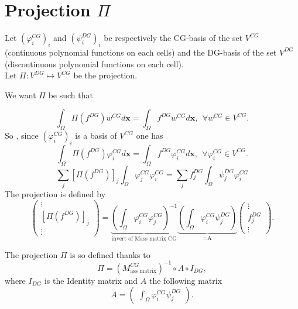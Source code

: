 \documentclass[a4paper, 11pt]{report}
\begin{document}
\section{Projection $\Pi$}
Let $(\varphi_i^{CG})_i$ and $(\psi_i^{DG})_i$ be respectively the CG-basis of the set $V^{CG}$ (continuous polynomial functions on each cells)  and the DG-basis of the set $V^{DG}$ (discontinuous polynomial functions on each cell). \\
Let $\Pi : V^{DG} \mapsto V^{CG} $ be the projection.


We want $\Pi$ be such that 

\begin{equation*}
\int_{\Omega}\Pi(f^{DG})w^{CG}d\boldsymbol{x}=\int_{\Omega}f^{DG}w^{CG}d\boldsymbol{x},\ \ \forall w^{CG} \in V^{CG}.
\end{equation*}
So , since $(\varphi_i^{CG})_i$ is a basis of $V^{CG}$ one has
\begin{equation*}
\int_{\Omega}\Pi(f^{DG})\varphi_i^{CG}d\boldsymbol{x}=\int_{\Omega}f^{DG}\varphi_i^{CG}d\boldsymbol{x},\ \ \forall \varphi_i^{CG} \in V^{CG}.
\end{equation*}
\begin{equation*}
\sum_{j}\left[\Pi(f^{DG})\right]_j\int_{\Omega}\varphi_j^{CG}\varphi_i^{CG}=\sum_{j}f_j^{DG}\int_{\Omega}\psi_j^{DG}\varphi_i^{CG}
\end{equation*}
The projection is defined by
\begin{equation*}
\begin{pmatrix}\vdots\\ \left[\Pi(f^{DG})\right]_j\\\vdots\end{pmatrix}=\underbrace{\left(\int_{\Omega}\varphi_i^{CG}\varphi_j^{CG}\right)^{-1}}_{\text{invert of Mass matrix CG}}\underbrace{\left(\int_{\Omega}\varphi_i^{CG}\psi_j^{DG}\right) }_{\text{=A}}\begin{pmatrix}\vdots\\f_j^{DG}\\\vdots\end{pmatrix}.
\end{equation*}


The projection $\Pi$ is so defined thanks to
\begin{equation*}
\Pi = \left(M_{\text{ass matrix}}^{CG}\right)^{-1}\circ A\circ I_{DG},
\end{equation*}
where $I_{DG}$ is the Identity matrix and $A$ the following matrix
\begin{equation*}
A=\begin{pmatrix}\int_{\Omega}\varphi_i^{CG}\psi_j^{DG}\end{pmatrix}. 
\end{equation*}
\end{document}
